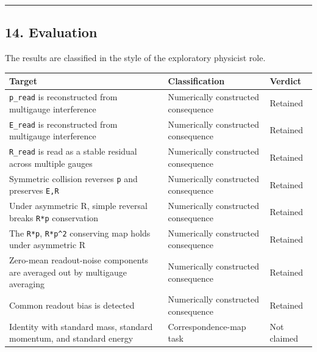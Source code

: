 \documentclass[
  a4paper,
]{article}
\newcounter{none} %
\begin{document}
\begin{center}\rule{0.5\linewidth}{0.5pt}\end{center}

\subsection{14. Evaluation}\label{evaluation}

The results are classified in the style of the exploratory physicist
role.

{\def\LTcaptype{none} %
\begin{longtable}[]{@{}
  >{\raggedright\arraybackslash}p{}
  >{\raggedright\arraybackslash}p{}
  >{\raggedright\arraybackslash}p{}@{}}
\toprule\noalign{}
\begin{minipage}[b]{\linewidth}\raggedright
Target
\end{minipage} & \begin{minipage}[b]{\linewidth}\raggedright
Classification
\end{minipage} & \begin{minipage}[b]{\linewidth}\raggedright
Verdict
\end{minipage} \\
\midrule\noalign{}
\endhead
\bottomrule\noalign{}
\endlastfoot
\texttt{p\_read} is reconstructed from multigauge interference &
Numerically constructed consequence & Retained \\
\texttt{E\_read} is reconstructed from multigauge interference &
Numerically constructed consequence & Retained \\
\texttt{R\_read} is read as a stable residual across multiple gauges &
Numerically constructed consequence & Retained \\
Symmetric collision reverses \texttt{p} and preserves \texttt{E,R} &
Numerically constructed consequence & Retained \\
Under asymmetric R, simple reversal breaks \texttt{R*p} conservation &
Numerically constructed consequence & Retained \\
The \texttt{R*p}, \texttt{R*p\^{}2} conserving map holds under
asymmetric R & Numerically constructed consequence & Retained \\
Zero-mean readout-noise components are averaged out by multigauge
averaging & Numerically constructed consequence & Retained \\
Common readout bias is detected & Numerically constructed consequence &
Retained \\
Identity with standard mass, standard momentum, and standard energy &
Correspondence-map task & Not claimed \\
\end{longtable}
}
\end{document}
